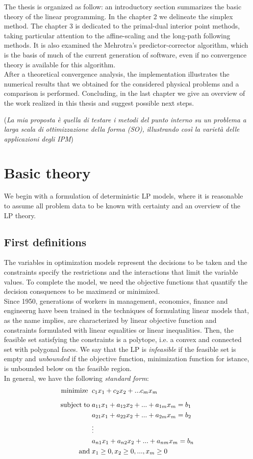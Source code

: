 \documentclass[a4paper,10 pt,titlepage,twoside]{book}
\theoremstyle{plain}
\theoremstyle{definition}
\theoremstyle{remark}
\begin{document}
The thesis is organized as follow:
an introductory section summarizes the basic theory of the linear programming. In the chapter 2 we delineate the simplex method. The chapter 3 is dedicated to the primal-dual interior point methods, taking particular attention to the affine-scaling and the long-path following methods. It is also examined the Mehrotra's predictor-corrector algorithm, which is the basis of much of the current generation of software, even if no convergence theory is available for this algorithm.\\After a theoretical convergence analysis, the implementation illustrates the numerical results that we obtained for the considered physical problems and a comparison is performed.
Concluding, in the last chapter we give an overview of the work realized in this thesis and suggest possible next steps. 

(\textit{La mia proposta è quella di testare i metodi del punto interno su un problema a larga scala di ottimizzazione della forma (SO), illustrando così la varietà delle applicazioni degli IPM})
%
\chapter{Basic theory}
We begin with a formulation of deterministic LP models, where it is reasonable to assume all problem data to be known with certainty and an overview of the LP theory. 
\section{First definitions}
The variables in optimization models represent the decisions to be taken and the constraints specify the restrictions and the interactions that limit the variable values.
To complete the model, we need the objective functions that quantify the decision consquences to be maximezd or minimized. \\
Since 1950, generations of workers in management, economics, finance and engineerng have been trained in the techniques of formulating linear models that,
as the name implies, are characterized by linear objective function and constraints formulated with linear equalities or linear inequalities.
Then, the feasible set satisfying the constraints is a polytope, i.e. a convex and connected set with polygonal faces. We say that the LP is \textit{infeasible} if the feasible set is empty and \textit{unbounded} if the objective function, minimization function for istance, is unbounded below on the feasible region.\\
In general, we have the following \textit{standard form}:
\begin{alignat*}{1}\label{eq:stdform}
\text{minimize\;}\; &c_1 x_1 + c_2 x_2+ ... c_m x_m\\[2mm]
\text{subject\;to\;} &a_{11} x_1 + a_{12} x_2+ ... +a_{1m}x_m = b_1\\
&a_{21} x_1 + a_{22} x_2 + ... + a_{2m} x_m= b_2\\
&\vdots\\
&a_{n1} x_1 + a_{n2} x_2 + ... + a_{nm} x_m= b_n\\
\text{and}\; & x_1 \geq 0 , x_2 \geq 0, ... , x_m \geq 0
 \end{alignat*}
\end{document}
